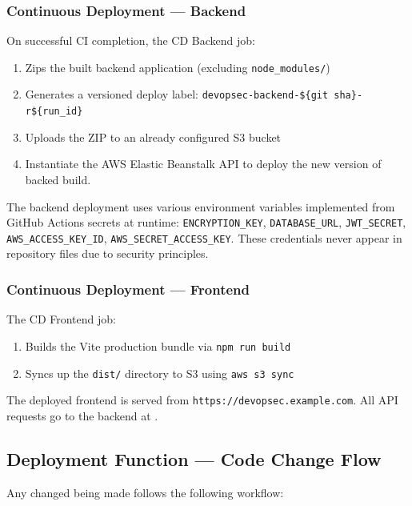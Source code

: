\documentclass[conference]{IEEEtran}
\begin{document}
\subsubsection{Continuous Deployment — Backend}

On successful CI completion, the CD Backend job:

\begin{enumerate}
  \item Zips the built backend application (excluding \texttt{node\_modules/})
  \item Generates a versioned deploy label: \texttt{devopsec-backend-\$\{git\ sha\}-r\$\{run\_id\}}
  \item Uploads the ZIP to an already configured S3 bucket
  \item Instantiate the AWS Elastic Beanstalk API to deploy the new version of backed build.
\end{enumerate}

The backend deployment uses various environment variables implemented from GitHub Actions secrets at runtime: \texttt{ENCRYPTION\_KEY}, \texttt{DATABASE\_URL}, \texttt{JWT\_SECRET}, \texttt{AWS\_ACCESS\_KEY\_ID}, \texttt{AWS\_SECRET\_ACCESS\_KEY}. These credentials never appear in repository files due to security principles.

\subsubsection{Continuous Deployment — Frontend}

The CD Frontend job:

\begin{enumerate}
  \item Builds the Vite production bundle via \texttt{npm run build}
  \item Syncs up the \texttt{dist/} directory to S3 using \texttt{aws s3 sync}
\end{enumerate}

 The deployed frontend is served from \texttt{https://devopsec.example.com}. All API requests go to the backend at \texttt{}.

\subsection{Deployment Function — Code Change Flow}

Any changed being made follows the following workflow:
\end{document}

